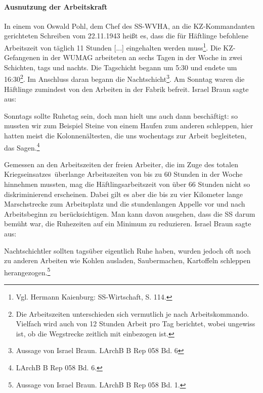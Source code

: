 \begin{landscape}
\end{landscape}

\paragraph{Ausnutzung der Arbeitskraft}
In einem von Oswald Pohl, dem Chef des SS-WVHA, an die KZ-Kommandanten gerichteten Schreiben vom 22.11.1943 heißt es, dass \glqq die für Häftlinge befohlene Arbeitszeit von täglich 11 Stunden [...] eingehalten werden muss\grqq\footnote{Vgl. Hermann Kaienburg: SS-Wirtschaft, S. 114.}. Die KZ-Gefangenen in der WUMAG arbeiteten an sechs Tagen in der Woche in zwei Schichten, tags und nachts. Die Tagschicht begann um 5:30 und endete um 16:30\footnote{Die Arbeitszeiten unterschieden sich vermutlich je nach Arbeitskommando. Vielfach wird auch von 12 Stunden Arbeit pro Tag berichtet, wobei ungewiss ist, ob die Wegstrecke zeitlich mit einbezogen ist.}. Im Anschluss daran begann die Nachtschicht\footnote{Aussage von Israel Braun. LArchB B Rep 058 Bd. 6}. Am Sonntag waren die Häftlinge zumindest von den Arbeiten in der Fabrik befreit. Israel Braun sagte aus:

\begin{leftbar}
Sonntags sollte Ruhetag sein, doch man hielt uns auch dann beschäftigt: so mussten wir zum Beispiel Steine von einem Haufen zum anderen schleppen, hier hatten meist die Kolonnenältesten, die uns wochentags zur Arbeit begleiteten, das Sagen.\footnote{LArchB B Rep 058 Bd. 6.}
\end{leftbar}

Gemessen an den Arbeitszeiten der freien Arbeiter, die im Zuge des \glqq totalen Kriegseinsatzes\grqq~überlange Arbeitszeiten von bis zu 60 Stunden in der Woche hinnehmen mussten, mag die Häftlingsarbeitszeit von über 66 Stunden nicht so diskriminierend erscheinen. Dabei gilt es aber die bis zu vier Kilometer lange Marschstrecke zum Arbeitsplatz und die stundenlangen Appelle vor und nach Arbeitsbeginn zu berücksichtigen. Man kann davon ausgehen, dass die SS darum bemüht war, die Ruhezeiten auf ein Minimum zu reduzieren. Israel Braun sagte aus:

\begin{leftbar}
Nachtschichtler sollten tagsüber eigentlich Ruhe haben, wurden jedoch oft noch zu anderen Arbeiten wie Kohlen ausladen, Saubermachen, Kartoffeln schleppen herangezogen.\footnote{Aussage von Israel Braun. LArchB B Rep 058 Bd. 1.}
\end{leftbar}

